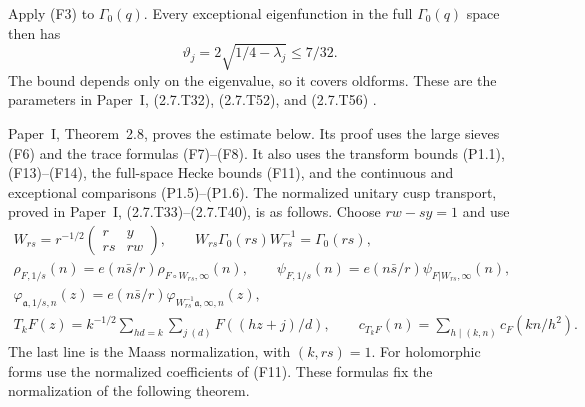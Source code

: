\begin{fact}\label{fact:full-space-spectral-gap}
Apply (F3) to $\Gamma_0(q)$.
Every exceptional eigenfunction in the full $\Gamma_0(q)$ space then has
\[
 \vartheta_j=2\sqrt{1/4-\lambda_j}\le7/32.
\]
The bound depends only on the eigenvalue, so it covers oldforms.
These are the parameters in Paper~I, (2.7.T32), (2.7.T52), and (2.7.T56)
\cite[(2.7.T32), (2.7.T52), (2.7.T56), pp.~20, 24--25]{PaperI}.
\end{fact}

\begin{fact}\label{fact:spectral-implication}
Paper~I, Theorem~2.8, proves the estimate below. Its proof uses
the large sieves (F6) and the trace formulas (F7)--(F8). It also uses the transform
bounds (P1.1), (F13)--(F14), the full-space Hecke bounds (F11), and
the continuous and exceptional comparisons (P1.5)--(P1.6).
The normalized unitary cusp transport, proved in Paper~I,
(2.7.T33)--(2.7.T40), is as follows. Choose $rw-sy=1$ and use
\begin{equation}\label{eq:unitary-cusp-transport}
 \begin{gathered}
 W_{rs}=r^{-1/2}\begin{pmatrix}r&y\\rs&rw\end{pmatrix},\qquad
 W_{rs}\Gamma_0(rs)W_{rs}^{-1}=\Gamma_0(rs),\\
 \rho_{F,1/s}(n)=e(n\bar s/r)\rho_{F\circ W_{rs},\infty}(n),\qquad
 \psi_{F,1/s}(n)=e(n\bar s/r)\psi_{F|W_{rs},\infty}(n),\\
 \varphi_{\mathfrak a,1/s,n}(z)
   =e(n\bar s/r)\varphi_{W_{rs}^{-1}\mathfrak a,\infty,n}(z),\\
 T_kF(z)=k^{-1/2}\sum_{hd=k}\sum_{j\ (d)}F((hz+j)/d),\qquad
 c_{T_kF}(n)=\sum_{h\mid(k,n)}c_F(kn/h^2).
 \end{gathered}
\end{equation}
The last line is the Maass normalization, with $(k,rs)=1$.
For holomorphic forms use the normalized coefficients of (F11).
These formulas fix the normalization of the following theorem.


\end{fact}

